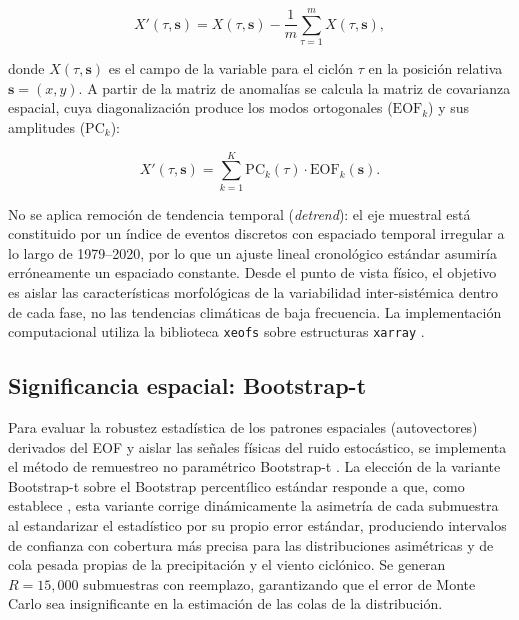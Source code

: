 \begin{equation}
    X'(\tau, \mathbf{s}) = X(\tau, \mathbf{s}) - \frac{1}{m}\sum_{\tau=1}^{m}X(\tau, \mathbf{s}),
\end{equation}

donde $X(\tau, \mathbf{s})$ es el campo de la variable para el ciclón $\tau$ en la posición relativa $\mathbf{s} = (x,y)$. A partir de la matriz de anomalías se calcula la matriz de covarianza espacial, cuya diagonalización produce los modos ortogonales ($\text{EOF}_k$) y sus amplitudes ($\text{PC}_k$):

\begin{equation}
    X'(\tau, \mathbf{s}) = \sum_{k=1}^{K} \text{PC}_k(\tau) \cdot \text{EOF}_k(\mathbf{s}).
\end{equation}

No se aplica remoción de tendencia temporal (\textit{detrend}): el eje muestral está constituido por un índice de eventos discretos con espaciado temporal irregular a lo largo de 1979--2020, por lo que un ajuste lineal cronológico estándar asumiría erróneamente un espaciado constante. Desde el punto de vista físico, el objetivo es aislar las características morfológicas de la variabilidad inter-sistémica dentro de cada fase, no las tendencias climáticas de baja frecuencia. La implementación computacional utiliza la biblioteca \texttt{xeofs} \citep{rieger2024xeofs} sobre estructuras \texttt{xarray} \citep{hoyer2017xarray}.

\subsection{Significancia espacial: Bootstrap-t}\label{subsec:bootstrap_significancia}

Para evaluar la robustez estadística de los patrones espaciales (autovectores) derivados del EOF y aislar las señales físicas del ruido estocástico, se implementa el método de remuestreo no paramétrico Bootstrap-t \citep{efron1993introduction}. La elección de la variante Bootstrap-t sobre el Bootstrap percentílico estándar responde a que, como establece \citet{hesterberg2015bootstrap}, esta variante corrige dinámicamente la asimetría de cada submuestra al estandarizar el estadístico por su propio error estándar, produciendo intervalos de confianza con cobertura más precisa para las distribuciones asimétricas y de cola pesada propias de la precipitación y el viento ciclónico. Se generan $R = 15{,}000$ submuestras con reemplazo, garantizando que el error de Monte Carlo sea insignificante en la estimación de las colas de la distribución.

